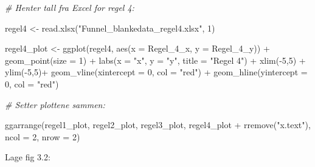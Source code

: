 \documentclass[
]{book}
\newenvironment{Shaded}{\begin{snugshade}}{\end{snugshade}}
\newcommand{\AttributeTok}[1]{\textcolor[rgb]{0.77,0.63,0.00}{#1}}
\newcommand{\CommentTok}[1]{\textcolor[rgb]{0.56,0.35,0.01}{\textit{#1}}}
\newcommand{\DecValTok}[1]{\textcolor[rgb]{0.00,0.00,0.81}{#1}}
\newcommand{\FunctionTok}[1]{\textcolor[rgb]{0.00,0.00,0.00}{#1}}
\newcommand{\NormalTok}[1]{#1}
\newcommand{\OtherTok}[1]{\textcolor[rgb]{0.56,0.35,0.01}{#1}}
\newcommand{\SpecialCharTok}[1]{\textcolor[rgb]{0.00,0.00,0.00}{#1}}
\newcommand{\StringTok}[1]{\textcolor[rgb]{0.31,0.60,0.02}{#1}}
\begin{document}
\begin{Shaded}
\begin{Highlighting}[]
\CommentTok{\# Henter tall fra Excel for regel 4:}

\NormalTok{regel4 }\OtherTok{\textless{}{-}} \FunctionTok{read.xlsx}\NormalTok{(}\StringTok{"Funnel\_blankedata\_regel4.xlsx"}\NormalTok{, }\DecValTok{1}\NormalTok{)}

\NormalTok{regel4\_plot }\OtherTok{\textless{}{-}} \FunctionTok{ggplot}\NormalTok{(regel4, }\FunctionTok{aes}\NormalTok{(}\AttributeTok{x =}\NormalTok{ Regel\_4\_x, }\AttributeTok{y =}\NormalTok{ Regel\_4\_y)) }\SpecialCharTok{+}
  \FunctionTok{geom\_point}\NormalTok{(}\AttributeTok{size =} \DecValTok{1}\NormalTok{) }\SpecialCharTok{+} \FunctionTok{labs}\NormalTok{(}\AttributeTok{x =} \StringTok{"x"}\NormalTok{, }\AttributeTok{y =} \StringTok{"y"}\NormalTok{, }\AttributeTok{title =} \StringTok{"Regel 4"}\NormalTok{) }\SpecialCharTok{+} \FunctionTok{xlim}\NormalTok{(}\SpecialCharTok{{-}}\DecValTok{5}\NormalTok{,}\DecValTok{5}\NormalTok{) }\SpecialCharTok{+} \FunctionTok{ylim}\NormalTok{(}\SpecialCharTok{{-}}\DecValTok{5}\NormalTok{,}\DecValTok{5}\NormalTok{)}\SpecialCharTok{+} \FunctionTok{geom\_vline}\NormalTok{(}\AttributeTok{xintercept =} \DecValTok{0}\NormalTok{, }\AttributeTok{col =} \StringTok{"red"}\NormalTok{) }\SpecialCharTok{+} \FunctionTok{geom\_hline}\NormalTok{(}\AttributeTok{yintercept =} \DecValTok{0}\NormalTok{, }\AttributeTok{col =} \StringTok{"red"}\NormalTok{)}

\CommentTok{\# Setter plottene sammen:}

\FunctionTok{ggarrange}\NormalTok{(regel1\_plot, regel2\_plot, regel3\_plot, regel4\_plot }
 \SpecialCharTok{+} \FunctionTok{rremove}\NormalTok{(}\StringTok{"x.text"}\NormalTok{), }\AttributeTok{ncol =} \DecValTok{2}\NormalTok{, }\AttributeTok{nrow =} \DecValTok{2}\NormalTok{)}
\end{Highlighting}
\end{Shaded}

Lage fig 3.2:
\end{document}
